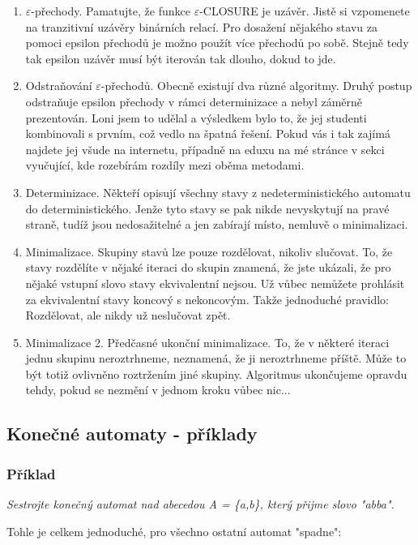 \documentclass{article}
\begin{document}
\begin{enumerate}
  \item $\varepsilon$-přechody. Pamatujte, že funkce $\varepsilon$-CLOSURE je uzávěr. Jistě si vzpomenete na tranzitivní uzávěry binárních relací. Pro dosažení nějakého stavu za pomoci epsilon přechodů je možno použít více přechodů po sobě. Stejně tedy tak epsilon uzávěr musí být iterován tak dlouho, dokud to jde.
  \item Odstraňování $\varepsilon$-přechodů. Obecně existují dva různé algoritmy. Druhý postup odstraňuje epsilon přechody v rámci determinizace a nebyl záměrně prezentován. Loni jsem to udělal a výsledkem bylo to, že jej studenti kombinovali s prvním, což vedlo na špatná řešení. Pokud vás i tak zajímá najdete jej všude na internetu, případně na eduxu na mé stránce v sekci vyučující, kde rozebírám rozdíly mezi oběma metodami. 
  \item Determinizace. Někteří opisují všechny stavy z nedeterministického automatu do deterministického. Jenže tyto stavy se pak nikde nevyskytují na pravé straně, tudíž jsou nedosažitelné a jen zabírají místo, nemluvě o minimalizaci.
  \item Minimalizace. Skupiny stavů lze pouze rozdělovat, nikoliv slučovat. To, že stavy rozdělíte v nějaké iteraci do skupin znamená, že jste ukázali, že pro nějaké vstupní slovo stavy ekvivalentní nejsou. Už vůbec nemůžete prohlásit za ekvivalentní stavy koncový s nekoncovým. Takže jednoduché pravidlo: Rozdělovat, ale nikdy už neslučovat zpět.
  \item Minimalizace 2. Předčasné ukonční minimalizace. To, že v některé iteraci jednu skupinu neroztrhneme, neznamená, že ji neroztrhneme příště. Může to být totiž ovlivněno roztržením jiné skupiny. Algoritmus ukončujeme opravdu tehdy, pokud se nezmění v jednom kroku vůbec nic...
\end{enumerate}


\subsection{Konečné automaty - příklady}

\subsubsection{Příklad}
\label{wholematch}
\emph{
Sestrojte konečný automat nad abecedou A = \{a,b\}, který přijme slovo "abba".
}

Tohle je celkem jednoduché, pro všechno ostatní automat "spadne":
\end{document}
